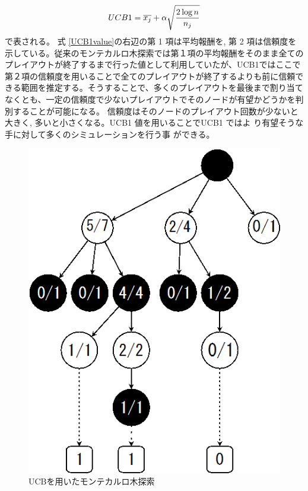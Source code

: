 \begin{equation}
\label{UCB1value}
\Large UCB1 = \overline {x_{j}}+\alpha \sqrt {\displaystyle \frac {2\log{n}} {n_{j}}}
\end{equation}
で表される。
式 \ref{UCB1value}の右辺の第 1 項は平均報酬を, 第 2 項は信頼度を示している。従来のモンテカルロ木探索では第１項の平均報酬をそのまま全てのプレイアウトが終了するまで行った値として利用していたが、UCB1ではここで第２項の信頼度を用いることで全てのプレイアウトが終了するよりも前に信頼できる範囲を推定する。そうすることで、多くのプレイアウトを最後まで割り当てなくとも、一定の信頼度で少ないプレイアウトでそのノードが有望かどうかを判別することが可能になる。
信頼度はそのノードのプレイアウト回数が少ないと大きく, 多いと小さくなる。UCB1 値を用いることでUCB1 ではよ り有望そうな手に対して多くのシミュレーションを行う事 ができる。

\begin{figure}[h]
 \centering
 \includegraphics[keepaspectratio, scale=0.75,bb=0 0 304 387]
      {img/UCB.png}
 \caption{UCBを用いたモンテカルロ木探索}
 \label{monte2}
\end{figure}

